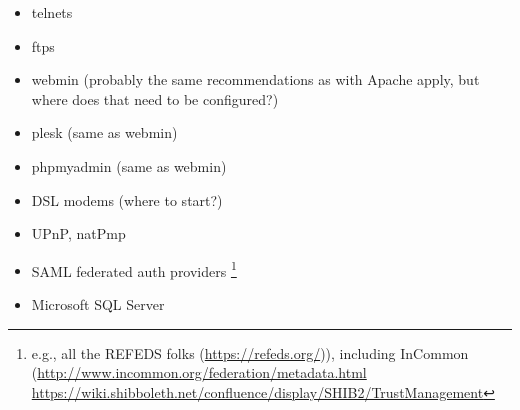 \begin{multicols}{3}
\begin{itemize}
\item telnets 
\item ftps 
\item webmin (probably the same recommendations as with Apache apply, but where does that need to be configured?)
\item plesk (same as webmin)
\item phpmyadmin (same as webmin)
\item DSL modems (where to start?)
\item UPnP, natPmp 
\item SAML federated auth providers \footnote{e.g., all the REFEDS folks (\url{https://refeds.org/})), including InCommon (\url{http://www.incommon.org/federation/metadata.html}
  \url{https://wiki.shibboleth.net/confluence/display/SHIB2/TrustManagement} }
\item Microsoft SQL Server
\end{itemize}
\end{multicols}

